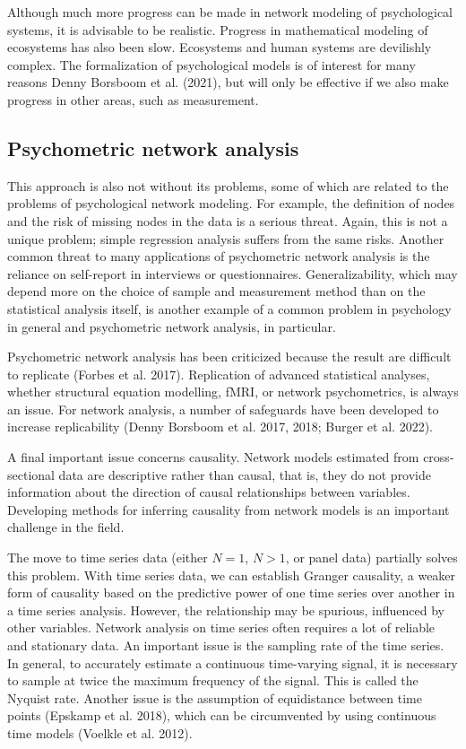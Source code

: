 \documentclass[
  letterpaper,
]{scrbook}
\begin{document}
Although much more progress can be made in network modeling of
psychological systems, it is advisable to be realistic. Progress in
mathematical modeling of ecosystems has also been slow. Ecosystems and
human systems are devilishly complex. The formalization of psychological
models is of interest for many reasons Denny Borsboom et al. (2021), but
will only be effective if we also make progress in other areas, such as
measurement.

\hypertarget{psychometric-network-analysis}{%
\subsection{Psychometric network
analysis}\label{psychometric-network-analysis}}

This approach is also not without its problems, some of which are
related to the problems of psychological network modeling. For example,
the definition of nodes and the risk of missing nodes in the data is a
serious threat. Again, this is not a unique problem; simple regression
analysis suffers from the same risks. Another common threat to many
applications of psychometric network analysis is the reliance on
self-report in interviews or questionnaires. Generalizability, which may
depend more on the choice of sample and measurement method than on the
statistical analysis itself, is another example of a common problem in
psychology in general and psychometric network analysis, in particular.

Psychometric network analysis has been criticized because the result are
difficult to replicate (Forbes et al. 2017). Replication of advanced
statistical analyses, whether structural equation modelling, fMRI, or
network psychometrics, is always an issue. For network analysis, a
number of safeguards have been developed to increase replicability
(Denny Borsboom et al. 2017, 2018; Burger et al. 2022).

A final important issue concerns causality. Network models estimated
from cross-sectional data are descriptive rather than causal, that is,
they do not provide information about the direction of causal
relationships between variables. Developing methods for inferring
causality from network models is an important challenge in the field.

The move to time series data (either \(N=1\), \(N>1\), or panel data)
partially solves this problem. With time series data, we can establish
Granger causality, a weaker form of causality based on the predictive
power of one time series over another in a time series analysis.
However, the relationship may be spurious, influenced by other
variables. Network analysis on time series often requires a lot of
reliable and stationary data. An important issue is the sampling rate of
the time series. In general, to accurately estimate a continuous
time-varying signal, it is necessary to sample at twice the maximum
frequency of the signal. This is called the Nyquist rate. Another issue
is the assumption of equidistance between time points (Epskamp et al.
2018), which can be circumvented by using continuous time models
(Voelkle et al. 2012).
\end{document}
